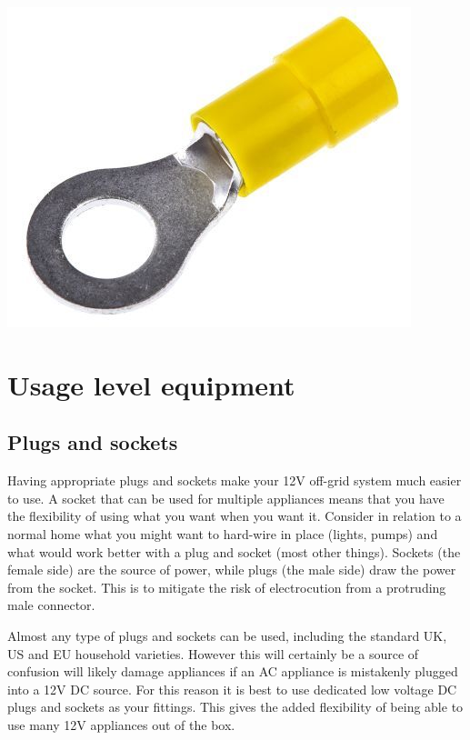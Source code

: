 \documentclass{article}
\theoremstyle{definition}
\theoremstyle{definition}
\theoremstyle{remark}
\begin{document}
      \begin{center}
        \includegraphics[width=0.15\paperwidth]{../Images/image_8_5_(ring_connector).png}
      \end{center}
    



{\color{blue}\section{Usage level equipment}} %
\label{sec:usage_level_equipment}

  {\color{blue}\subsection{Plugs and sockets}} %
  \label{sub:plugs_and_sockets}

    Having appropriate plugs and sockets make your 12V off-grid system much easier to use. A socket that can be used for multiple appliances means that you have the flexibility of using what you want when you want it. Consider in relation to a normal home what you might want to hard-wire in place (lights, pumps) and what would work better with a plug and socket (most other things). Sockets (the female side) are the source of power, while plugs (the male side) draw the power from the socket. This is to mitigate the risk of electrocution from a protruding male connector. 

    Almost any type of plugs and sockets can be used, including the standard UK, US and EU household varieties. However this will certainly be a source of confusion will likely damage appliances if an AC appliance is mistakenly plugged into a 12V DC source. For this reason it is best to use dedicated low voltage DC plugs and sockets as your fittings. This gives the added flexibility of being able to use many 12V appliances out of the box.
\end{document}
